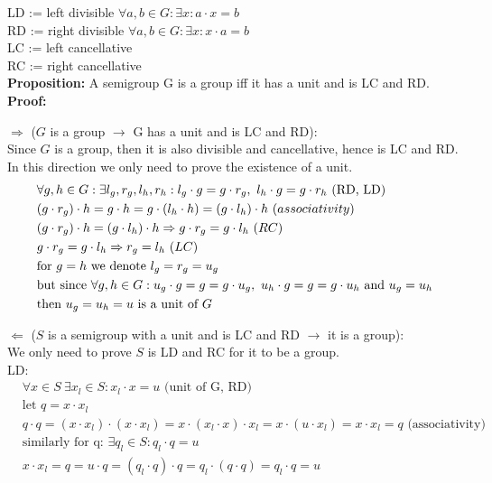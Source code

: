 \documentclass[a4paper]{article}
\begin{document}
\thispagestyle{fancy} %
{}

LD := left divisible $\forall a, b \in G: \exists x: a\cdot x = b$\\
RD := right divisible $\forall a, b \in G: \exists x: x\cdot a = b$\\
LC := left cancellative\\
RC := right cancellative\\

\textbf{Proposition:} A semigroup G is a group iff it has a unit and is LC and RD. \\

\textbf{Proof:}

$\Rightarrow$ ($G$ is a group $\rightarrow$ G has a unit and is LC and RD):\\
Since $G$ is a group, then it is also divisible and cancellative, hence is LC and RD. In this direction we only need to prove the existence of a unit.
\begin{align*}
 & \forall g,h \in G: \exists l_g, r_g, l_h, r_h: l_g \cdot g = g \cdot r_g,\ l_h \cdot g = g \cdot r_h \text{ (RD, LD)}\\
 & (g\cdot r_g) \cdot h = g\cdot h = g \cdot (l_h \cdot h) = (g \cdot l_h) \cdot h \ \text(associativity)\\
 & (g\cdot r_g) \cdot h = (g\cdot l_h) \cdot h \Rightarrow g\cdot r_g = g\cdot l_h\ \text(RC) \\
 & g\cdot r_g = g\cdot l_h \Rightarrow r_g = l_h\ \text(LC) \\
 & \text{for } g = h \text{ we denote } l_g = r_g = u_g \\
 & \text{but since } \forall g,h \in G: u_g \cdot g = g = g \cdot u_g,\ u_h \cdot g = g = g \cdot u_h \text{ and } u_g = u_h \\
 & \text{then } u_g = u_h = u \text{ is a unit of } G
\end{align*}

$\Leftarrow$ ($S$ is a semigroup with a unit and is LC and RD $\rightarrow$ it is a group):\\
We only need to prove $S$ is LD and RC for it to be a group.\\

LD:
\begin{align*}
 & \forall x \in S\ \exists x_l \in S: x_l\cdot x = u \text{ (unit of G, RD)} \\
 & \text{let } q = x\cdot x_l \\
 & q\cdot q = (x\cdot x_l)\cdot(x\cdot x_l) = x\cdot (x_l\cdot x)\cdot x_l = x\cdot (u \cdot x_l) = x\cdot x_l = q \text{ (associativity)} \\
 & \text{similarly for q: } \exists q_l\in S: q_l\cdot q = u \\
 & x \cdot x_l = q = u\cdot q = (q_l \cdot q) \cdot q = q_l \cdot (q\cdot q) = q_l \cdot q = u
\end{align*}
\end{document}
